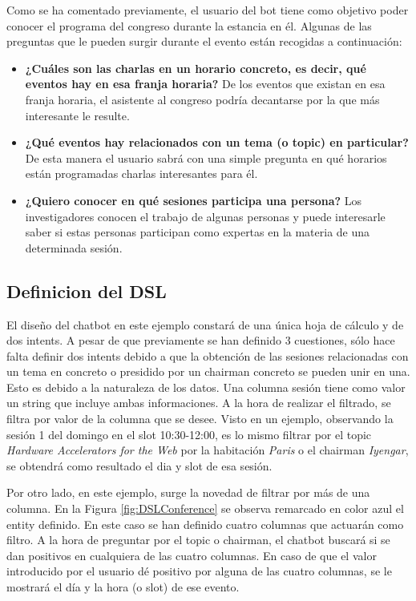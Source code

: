 Como se ha comentado previamente, el usuario del bot tiene como objetivo poder conocer el programa del congreso durante la estancia en él. Algunas de las preguntas que le pueden surgir durante el evento están recogidas a continuación:
\begin{itemize}
	\item \textbf{¿Cuáles son las charlas en un horario concreto, es decir, qué eventos hay en esa franja horaria?} De los eventos que existan en esa franja horaria, el asistente al congreso podría decantarse por la que más interesante le resulte.
	\item \textbf{¿Qué eventos hay relacionados con un tema (o topic) en particular?} De esta manera el usuario sabrá con una simple pregunta en qué horarios están programadas charlas interesantes para él.
	\item \textbf{¿Quiero conocer en qué sesiones participa una persona?} Los investigadores conocen el trabajo de algunas personas y puede interesarle saber si estas personas participan como expertas en la materia de una determinada sesión.
\end{itemize}

\subsection{Definicion del DSL}

El diseño del chatbot en este ejemplo constará de una única hoja de cálculo y de dos intents. A pesar de que previamente se han definido 3 cuestiones, sólo hace falta definir dos intents debido a que la obtención de las sesiones relacionadas con un tema en concreto o presidido por un chairman concreto se pueden unir en una. Esto es debido a la naturaleza de los datos. Una columna sesión tiene como valor un string que incluye ambas informaciones. A la hora de realizar el filtrado, se filtra por valor de la columna que se desee. Visto en un ejemplo, observando la sesión 1 del domingo en el slot 10:30-12:00, es lo mismo filtrar por el topic \emph{Hardware Accelerators for the Web} por la habitación \emph{Paris} o el chairman \emph{Iyengar}, se obtendrá como resultado el dia y slot de esa sesión.

Por otro lado, en este ejemplo, surge la novedad de filtrar por más de una columna. En la Figura \ref{fig:DSLConference} se observa remarcado en color azul el entity definido. En este caso se han definido cuatro columnas que actuarán como filtro. A la hora de preguntar por el topic o chairman, el chatbot buscará si se dan positivos en cualquiera de las cuatro columnas. En caso de que el valor introducido por el usuario dé positivo por alguna de las cuatro columnas, se le mostrará el día y la hora (o slot) de ese evento.

